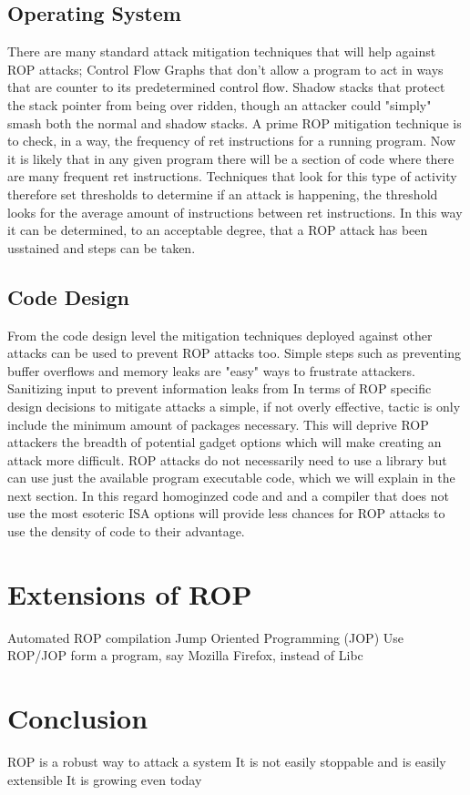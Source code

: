 \documentclass[11pt]{amsart}
\begin{document}
\subsection*{Operating System}
There are many standard attack mitigation techniques that will help against ROP attacks; Control Flow Graphs that don't allow a program to act in ways that are counter to its predetermined control flow.  Shadow stacks that protect the stack pointer from being over ridden, though an attacker could "simply" smash both the normal and shadow stacks.  
A prime ROP mitigation technique is to check, in a way, the frequency of ret instructions for a running program.  Now it is likely that in any given program there will be a section of code where there are many frequent ret instructions.  Techniques that look for this type of activity therefore set thresholds to determine if an attack is happening, the threshold looks for the average amount of instructions between ret instructions.  In this way it can be determined, to an acceptable degree, that a ROP attack has been usstained and steps can be taken.
\subsection*{Code Design}
From the code design level the mitigation techniques deployed against other attacks can be used to prevent ROP attacks too. Simple steps such as preventing buffer overflows and memory leaks are "easy" ways to frustrate attackers.  Sanitizing input to prevent information leaks from %
In terms of ROP specific design decisions to mitigate attacks a simple, if not overly effective, tactic is only include the minimum amount of packages necessary.  This will deprive ROP attackers the breadth of potential gadget options which will make creating an attack more difficult.  ROP attacks do not necessarily need to use a library but can use just the available program executable code, which we will explain in the next section.  In this regard homoginzed code and and a compiler that does not use the most esoteric ISA options will provide less chances for ROP attacks to use the density of code to their advantage.
\section*{Extensions of ROP}
Automated ROP compilation
Jump Oriented Programming (JOP)
Use ROP/JOP form a program, say Mozilla Firefox, instead of Libc
\section*{Conclusion}
ROP is a robust way to attack a system
It is not easily stoppable and is easily extensible
It is growing even today
\end{document}
